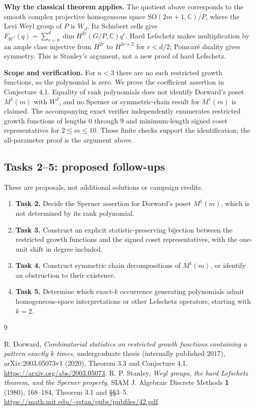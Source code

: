 \documentclass[11pt]{article}
\begin{document}
\noindent\textbf{Why the classical theorem applies.}
The quotient above corresponds to the smooth complex projective homogeneous
space $\mathrm{SO}(2m+1,\mathbb C)/P$, where the Levi Weyl group of $P$ is
$W_J$. Its Schubert cells give
$F_{W^J}(q)=\sum_{r=0}^d\dim H^{2r}(G/P,\mathbb C)q^r$.
Hard Lefschetz makes multiplication by an ample class injective from
$H^{2r}$ to $H^{2r+2}$ for $r<d/2$; Poincar\'e duality gives symmetry.
This is Stanley's argument, not a new proof of hard Lefschetz.

\noindent\textbf{Scope and verification.}
For $n<3$ there are no such restricted growth functions, so the polynomial
is zero. We prove the coefficient assertion in Conjecture 4.1. Equality
of rank polynomials does not identify Dorward's poset $M^1(m)$ with
$W^J$, and no Sperner or symmetric-chain result for $M^1(m)$ is claimed.
The accompanying exact verifier independently enumerates restricted growth
functions of lengths $0$ through $9$ and minimum-length signed coset
representatives for $2\leq m\leq10$. Those finite checks support the
identification; the all-parameter proof is the argument above.

\subsection*{Tasks 2--5: proposed follow-ups}
These are proposals, not additional solutions or campaign credits.
\begin{enumerate}
\item \textbf{Task 2.} Decide the Sperner assertion for Dorward's poset
$M^1(m)$, which is not determined by its rank polynomial.
\item \textbf{Task 3.} Construct an explicit statistic-preserving bijection
between the restricted growth functions and the signed coset representatives,
with the one-unit shift in degree included.
\item \textbf{Task 4.} Construct symmetric chain decompositions of $M^1(m)$,
or identify an obstruction to their existence.
\item \textbf{Task 5.} Determine which exact-$k$ occurrence generating
polynomials admit homogeneous-space interpretations or other Lefschetz
operators, starting with $k=2$.
\end{enumerate}

\begin{thebibliography}{9}\raggedright
{} R. Dorward, \emph{Combinatorial statistics on restricted growth
functions containing a pattern exactly $k$ times}, undergraduate thesis
(internally published 2017), arXiv:2003.05073v1 (2020), Theorem 3.3 and
Conjecture 4.1. \url{https://arxiv.org/abs/2003.05073}.
 R. P. Stanley, \emph{Weyl groups, the hard Lefschetz theorem,
and the Sperner property}, SIAM J. Algebraic Discrete Methods \textbf{1}
(1980), 168--184, Theorem 3.1 and \S\S3--5.
\url{https://math.mit.edu/~rstan/pubs/pubfiles/42.pdf}.
\end{thebibliography}
\end{document}
